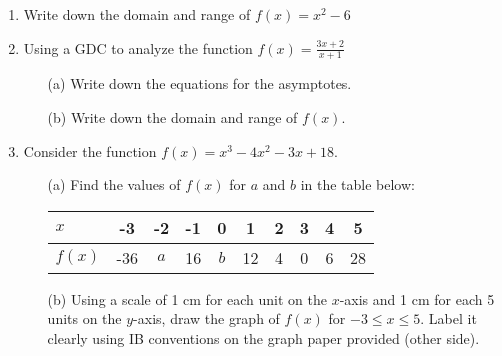 \documentclass{article}
\begin{document}
\begin{enumerate}
\item Write down the domain and range of $f(x)= x^2-6$

\item Using a GDC to analyze the function $\displaystyle f(x)= \frac {3x+2}{x+1}$
\begin{itemize}
    \item[(a)] Write down the equations for the asymptotes.
	\item[(b)] Write down the domain and range of $f(x)$.
\end{itemize}

\item Consider the function $f(x) = x^3 - 4x^2 - 3x + 18$.
\begin{itemize}
    \item[(a)] Find the values of $f(x)$ for $a$ and $b$ in the table below:\\
	\begin{tabular}{|l|c|c|c|c|c|c|c|c|c|}
	\hline
	$x$ & -3 & -2 & -1 & 0 & 1 & 2 & 3 & 4 & 5\\
	\hline
    $f(x)$ & -36 & $a$ & 16 & $b$ & 12 & 4 & 0 & 6 & 28\\
	\hline
	\end{tabular}
	\item[(b)] Using a scale of 1 cm for each unit on the $x$-axis and 1 cm for each 5 units on the $y$-axis, draw the graph of $f(x)$ for $-3 \leq x \leq 5$. Label it clearly using IB conventions on the graph paper provided (other side).
\end{itemize}
\end{enumerate}
\end{document}
